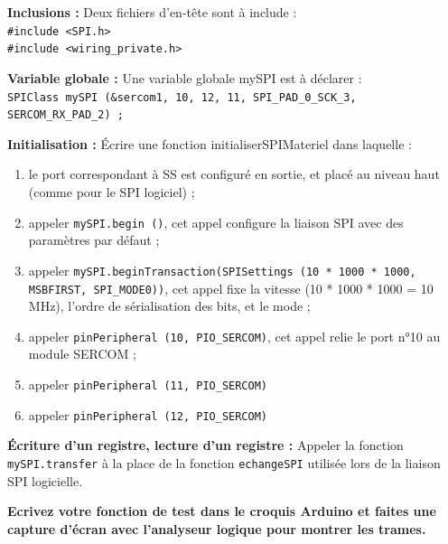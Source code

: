 \documentclass[11pt]{paper}
\begin{document}
{\bf Inclusions :} Deux fichiers d'en-tête sont à include :\\
{\tt \#include <SPI.h>}\\
{\tt \#include <wiring\_private.h>}\\
\bigskip

{\bf Variable globale :} Une variable globale mySPI est à déclarer :\\
{\tt SPIClass mySPI (\&sercom1, 10, 12, 11, SPI\_PAD\_0\_SCK\_3, SERCOM\_RX\_PAD\_2) ;}
\bigskip

{\bf Initialisation :} Écrire une fonction initialiserSPIMateriel dans laquelle :
\begin{enumerate}
	\item le port correspondant à SS est configuré en sortie, et placé au niveau haut (comme pour le SPI logiciel) ; 
	\item appeler {\tt mySPI.begin ()}, cet appel configure la liaison SPI avec des paramètres par défaut ;
	\item appeler {\tt mySPI.beginTransaction(SPISettings (10 * 1000 * 1000, MSBFIRST, SPI\_MODE0))}, 
cet appel fixe la vitesse (10 * 1000 * 1000 = 10 MHz), l'ordre de sérialisation des bits, et le mode ; 
	\item appeler {\tt pinPeripheral (10, PIO\_SERCOM)}, cet appel relie le port n°10 au module SERCOM ; 
	\item appeler {\tt pinPeripheral (11, PIO\_SERCOM)}
	\item appeler {\tt pinPeripheral (12, PIO\_SERCOM)}
\end{enumerate}
\bigskip

{\bf Écriture d'un registre, lecture d'un registre :} Appeler la fonction {\tt mySPI.transfer} à la place de la fonction {\tt echangeSPI} utilisée lors de la liaison SPI logicielle.

 {\bf Ecrivez votre fonction de test dans le croquis Arduino et faites une capture d'écran avec l'analyseur logique pour montrer les trames.}
\end{document}
